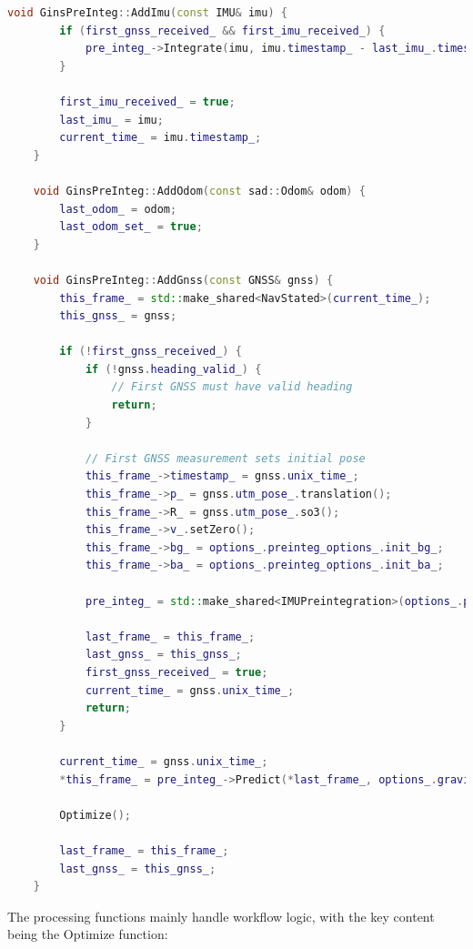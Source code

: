 \begin{lstlisting}[language=c++,caption=src/ch4/gins\_pre\_integ.cc]
	void GinsPreInteg::AddImu(const IMU& imu) {
		if (first_gnss_received_ && first_imu_received_) {
			pre_integ_->Integrate(imu, imu.timestamp_ - last_imu_.timestamp_);
		}
		
		first_imu_received_ = true;
		last_imu_ = imu;
		current_time_ = imu.timestamp_;
	}
	
	void GinsPreInteg::AddOdom(const sad::Odom& odom) {
		last_odom_ = odom;
		last_odom_set_ = true;
	}
	
	void GinsPreInteg::AddGnss(const GNSS& gnss) {
		this_frame_ = std::make_shared<NavStated>(current_time_);
		this_gnss_ = gnss;
		
		if (!first_gnss_received_) {
			if (!gnss.heading_valid_) {
				// First GNSS must have valid heading
				return;
			}
			
			// First GNSS measurement sets initial pose
			this_frame_->timestamp_ = gnss.unix_time_;
			this_frame_->p_ = gnss.utm_pose_.translation();
			this_frame_->R_ = gnss.utm_pose_.so3();
			this_frame_->v_.setZero();
			this_frame_->bg_ = options_.preinteg_options_.init_bg_;
			this_frame_->ba_ = options_.preinteg_options_.init_ba_;
			
			pre_integ_ = std::make_shared<IMUPreintegration>(options_.preinteg_options_);
			
			last_frame_ = this_frame_;
			last_gnss_ = this_gnss_;
			first_gnss_received_ = true;
			current_time_ = gnss.unix_time_;
			return;
		}
		
		current_time_ = gnss.unix_time_;
		*this_frame_ = pre_integ_->Predict(*last_frame_, options_.gravity_);
		
		Optimize();
		
		last_frame_ = this_frame_;
		last_gnss_ = this_gnss_;
	}
\end{lstlisting}

The processing functions mainly handle workflow logic, with the key content being the Optimize function:


